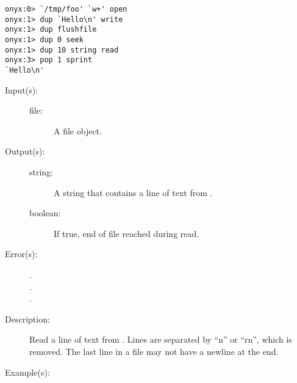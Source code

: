 \begin{description}
\begin{description}
\begin{verbatim}
onyx:0> `/tmp/foo' `w+' open
onyx:1> dup `Hello\n' write
onyx:1> dup flushfile
onyx:1> dup 0 seek
onyx:1> dup 10 string read
onyx:3> pop 1 sprint
`Hello\n'
		\end{verbatim}
	\end{description}
\label{systemdict:readline}
\item[{\onyxop{file}{readline}{string boolean}}: ]
	\begin{description}\item[]
	\item[Input(s): ]
		\begin{description}\item[]
		\item[file: ]
			A file object.
		\end{description}
	\item[Output(s): ]
		\begin{description}\item[]
		\item[string: ]
			A string that contains a line of text from .
		\item[boolean: ]
			If true, end of file reached during read.
		\end{description}
	\item[Error(s): ]
		\begin{description}\item[]
		\item[.]
		\item[.]
		\item[.]
		\end{description}
	\item[Description: ]
		Read a line of text from .  Lines are separated
		by ``{\bs}n'' or ``{\bs}r{\bs}n'', which is removed.  The
		last line in a file may not have a newline at the end.
	\item[Example(s): ]\begin{verbatim}


\end{verbatim}
\end{description}
\end{description}
